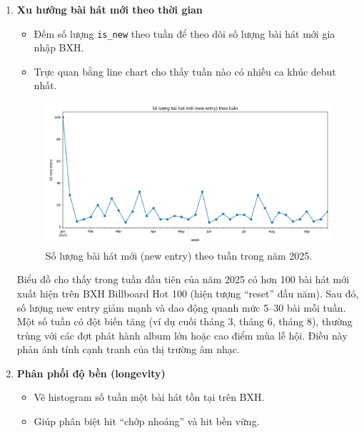 \begin{enumerate}[label=\arabic*]
    \item \textbf{Xu hướng bài hát mới theo thời gian}
    \begin{itemize}
        \item Đếm số lượng \texttt{is\_new} theo tuần để theo dõi số lượng bài hát mới gia nhập BXH.
        \item Trực quan bằng line chart cho thấy tuần nào có nhiều ca khúc debut nhất.
    \end{itemize}
    \begin{figure}[H]
        \centering
        \includegraphics[width=1.0\textwidth]{../graphics/data3/Output/step4/new_entry_trend.png}
        \caption{Số lượng bài hát mới (new entry) theo tuần trong năm 2025.}
        \label{fig:new_entry_trend}
    \end{figure}
    Biểu đồ cho thấy trong tuần đầu tiên của năm 2025 có hơn 100 bài hát mới xuất hiện trên BXH Billboard Hot 100 (hiện tượng “reset” đầu năm). Sau đó, số lượng new entry giảm mạnh và dao động quanh mức 5–30 bài mỗi tuần.  Một số tuần có đột biến tăng (ví dụ cuối tháng 3, tháng 6, tháng 8), thường trùng với các đợt phát hành album lớn hoặc cao điểm mùa lễ hội. Điều này phản ánh tính cạnh tranh của thị trường âm nhạc.

    \item \textbf{Phân phối độ bền (longevity)}
    \begin{itemize}
        \item Vẽ histogram số tuần một bài hát tồn tại trên BXH.
        \item Giúp phân biệt hit “chớp nhoáng” và hit bền vững.
    \end{itemize}
    

\end{enumerate}
